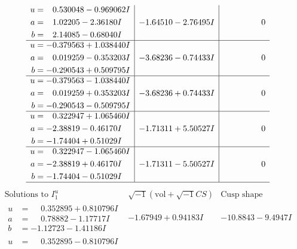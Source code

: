 \documentclass[1p]{elsarticle_modified}
\theoremstyle{definition}
\newcommand{\I}{\sqrt{-1}}
\begin{document}
$$\begin{array}{c|c|c}
\begin{aligned}
u &= \phantom{-}0.530048 - 0.969062 I \\
a &= \phantom{-}1.02205 - 2.36180 I \\
b &= \phantom{-}2.14085 - 0.68040 I\end{aligned}
 & -1.64510 - 2.76495 I & \phantom{-0.000000 } 0 \\ \hline\begin{aligned}
u &= -0.379563 + 1.038440 I \\
a &= \phantom{-}0.019259 - 0.353203 I \\
b &= -0.290543 + 0.509795 I\end{aligned}
 & -3.68236 - 0.74433 I & \phantom{-0.000000 } 0 \\ \hline\begin{aligned}
u &= -0.379563 - 1.038440 I \\
a &= \phantom{-}0.019259 + 0.353203 I \\
b &= -0.290543 - 0.509795 I\end{aligned}
 & -3.68236 + 0.74433 I & \phantom{-0.000000 } 0 \\ \hline\begin{aligned}
u &= \phantom{-}0.322947 + 1.065460 I \\
a &= -2.38819 - 0.46170 I \\
b &= -1.74404 + 0.51029 I\end{aligned}
 & -1.71311 + 5.50527 I & \phantom{-0.000000 } 0 \\ \hline\begin{aligned}
u &= \phantom{-}0.322947 - 1.065460 I \\
a &= -2.38819 + 0.46170 I \\
b &= -1.74404 - 0.51029 I\end{aligned}
 & -1.71311 - 5.50527 I & \phantom{-0.000000 } 0\\
 \hline 
 \end{array}$$\newpage$$\begin{array}{c|c|c}  
\text{Solutions to }I^u_{1}& \I (\text{vol} + \sqrt{-1}CS) & \text{Cusp shape}\\
 \hline 
\begin{aligned}
u &= \phantom{-}0.352895 + 0.810796 I \\
a &= \phantom{-}0.78882 - 1.17717 I \\
b &= -1.12723 - 1.41186 I\end{aligned}
 & -1.67949 + 0.94183 I & -10.8843 - 9.4947 I \\ \hline\begin{aligned}
u &= \phantom{-}0.352895 - 0.810796 I \\

\end{aligned}
\end{array}$$
\end{document}
